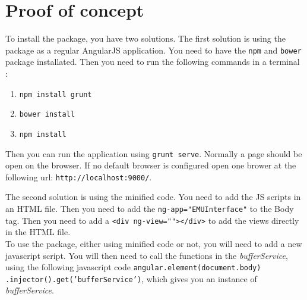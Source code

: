 \documentclass{article}
\begin{document}
\section{Proof of concept}

To install the package, you have two solutions. The first solution is using the package as a regular AngularJS application. You need to have the \texttt{npm} and \texttt{bower} package installated. Then you need to run the following commands in a terminal :
\begin{enumerate}
\item \texttt{npm install grunt}
\item \texttt{bower install}
\item \texttt{npm install}
\end{enumerate}
Then you can run the application using \texttt{grunt serve}. Normally a page should be open on the browser. If no default browser is configured open one brower at the following url: \texttt{http://localhost:9000/}.

The second solution is using the minified code. You need to add the JS scripts in an HTML file. Then you need to add the \texttt{ng-app="EMUInterface"} to the Body tag. Then you need to add a \texttt{<div ng-view=""></div>} to add the views directly in the HTML file. \\

To use the package, either using minified code or not, you will need to add a new javascript script. You will then need to call the functions in the \textit{bufferService}, using the following javascript code \texttt{angular.element(document.body)  .injector().get('bufferService')}, which gives you an instance of \textit{bufferService}.\\
\end{document}
